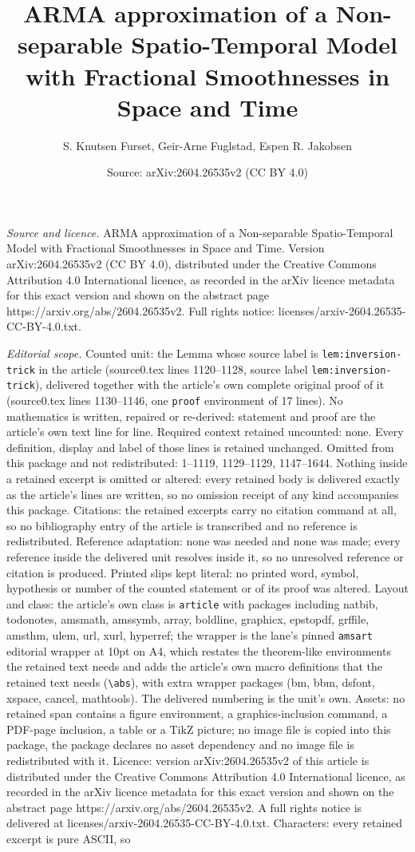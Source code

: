 \documentclass[10pt,a4paper]{amsart}
\title[ARMA approximation of a Non-separable Spatio-Temporal Model ]{ARMA approximation of a Non-separable Spatio-Temporal Model with Fractional Smoothnesses in Space and Time}
\author{S. Knutsen Furset, Geir-Arne Fuglstad, Espen R. Jakobsen}
\date{Source: arXiv:2604.26535v2 (CC BY 4.0)}
\begin{document}
\maketitle

\noindent\emph{Source and licence.} ARMA approximation of a Non-separable Spatio-Temporal Model with Fractional Smoothnesses in Space and Time. Version arXiv:2604.26535v2 (CC BY 4.0), distributed under the Creative Commons Attribution 4.0 International licence, as recorded in the arXiv licence metadata for this exact version and shown on the abstract page https://arxiv.org/abs/2604.26535v2. Full rights notice: licenses/arxiv-2604.26535-CC-BY-4.0.txt.\par\smallskip

\noindent\textit{Editorial scope.} Counted unit: the Lemma whose source label is \texttt{lem:inversion-trick} in the article (source0.tex lines 1120--1128, source label \texttt{lem:inversion-trick}), delivered together with the article's own complete original proof of it (source0.tex lines 1130--1146, one \texttt{proof} environment of 17 lines). No mathematics is written, repaired or re-derived: statement and proof are the article's own text line for line. Required context retained uncounted: none. Every definition, display and label of those lines is retained unchanged. Omitted from this package and not redistributed: 1--1119, 1129--1129, 1147--1644. Nothing inside a retained excerpt is omitted or altered: every retained body is delivered exactly as the article's lines are written, so no omission receipt of any kind accompanies this package. Citations: the retained excerpts carry no citation command at all, so no bibliography entry of the article is transcribed and no reference is redistributed. Reference adaptation: none was needed and none was made; every reference inside the delivered unit resolves inside it, so no unresolved reference or citation is produced. Printed slips kept literal: no printed word, symbol, hypothesis or number of the counted statement or of its proof was altered. Layout and class: the article's own class is \texttt{article} with packages including natbib, todonotes, amsmath, amssymb, array, boldline, graphicx, epstopdf, grffile, amsthm, ulem, url, xurl, hyperref; the wrapper is the lane's pinned \texttt{amsart} editorial wrapper at 10pt on A4, which restates the theorem-like environments the retained text needs and adds the article's own macro definitions that the retained text needs (\texttt{\textbackslash abs}), with extra wrapper packages (bm, bbm, dsfont, xspace, cancel, mathtools). The delivered numbering is the unit's own. Assets: no retained span contains a figure environment, a graphics-inclusion command, a PDF-page inclusion, a table or a TikZ picture; no image file is copied into this package, the package declares no asset dependency and no image file is redistributed with it. Licence: version arXiv:2604.26535v2 of this article is distributed under the Creative Commons Attribution 4.0 International licence, as recorded in the arXiv licence metadata for this exact version and shown on the abstract page https://arxiv.org/abs/2604.26535v2. A full rights notice is delivered at licenses/arxiv-2604.26535-CC-BY-4.0.txt. Characters: every retained excerpt is pure ASCII, so 
\end{document}
